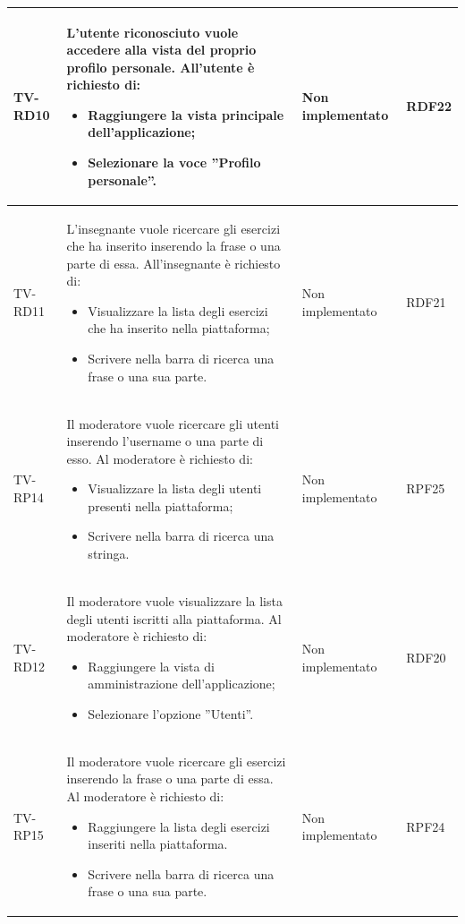 \begin{longtable}{|>{\centering\arraybackslash}m{1.6cm}|>{\centering\arraybackslash}m{6.41cm}|>{\centering\arraybackslash}m{3.1cm} | >{\centering\arraybackslash}m{2.6cm}|}
TV-RD10 & L’utente riconosciuto vuole accedere alla vista del proprio profilo personale. All'utente è richiesto di:
\begin{itemize}
  \item Raggiungere la vista principale dell'applicazione;
 \item Selezionare la voce ”Profilo personale”.
\end{itemize} & Non implementato & RDF22 \\ \hline

\rowcolor{LightGray}
TV-RD11 & L’insegnante vuole ricercare gli esercizi che ha inserito inserendo la frase o una parte di essa. All'insegnante è richiesto di:


\begin{itemize}
 \item Visualizzare la lista degli esercizi che ha inserito nella piattaforma;
 \item Scrivere nella barra di ricerca una frase o una sua parte.
\end{itemize} & Non implementato & RDF21 \\ \hline

TV-RP14 & Il moderatore vuole ricercare gli utenti inserendo l’username o una parte di esso. Al moderatore è richiesto di:
\begin{itemize}
 \item Visualizzare la lista degli utenti presenti nella piattaforma;
 \item Scrivere nella barra di ricerca una stringa.
\end{itemize} & Non implementato & RPF25 \\ \hline

		  \rowcolor{LightGray}
TV-RD12 & Il moderatore vuole visualizzare la lista degli utenti iscritti alla piattaforma. Al moderatore è richiesto di:
\begin{itemize}
 \item Raggiungere la vista di amministrazione dell’applicazione;
 \item Selezionare l’opzione ”Utenti”.
\end{itemize} & Non implementato & RDF20 \\ \hline

TV-RP15 & Il moderatore vuole ricercare gli esercizi inserendo la frase o una parte di essa. Al moderatore è richiesto di:

\begin{itemize}
 \item Raggiungere la lista degli esercizi inseriti nella piattaforma.
 \item Scrivere nella barra di ricerca una frase o una sua parte.
\end{itemize} & Non implementato & RPF24 \\ \hline


\end{longtable}
